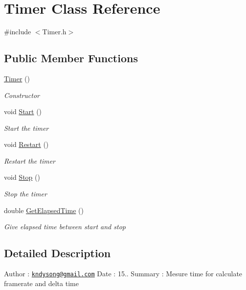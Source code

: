 \hypertarget{class_timer}{}\section{Timer Class Reference}
\label{class_timer}


{\ttfamily \#include $<$Timer.\+h$>$}

\subsection*{Public Member Functions}
\begin{DoxyCompactItemize}
\item 
\mbox{\hyperlink{class_timer_a5f16e8da27d2a5a5242dead46de05d97}{Timer}} ()
\begin{DoxyCompactList}\small\item\em Constructor \end{DoxyCompactList}\item 
void \mbox{\hyperlink{class_timer_a4e607b129b392c11adddd9641a320436}{Start}} ()
\begin{DoxyCompactList}\small\item\em Start the timer \end{DoxyCompactList}\item 
void \mbox{\hyperlink{class_timer_a44a5a286f0086968f0b079c089befbd2}{Restart}} ()
\begin{DoxyCompactList}\small\item\em Restart the timer \end{DoxyCompactList}\item 
void \mbox{\hyperlink{class_timer_a6379e797f968aaee6ac3bb12dc6b81c5}{Stop}} ()
\begin{DoxyCompactList}\small\item\em Stop the timer \end{DoxyCompactList}\item 
double \mbox{\hyperlink{class_timer_abee36a752625ebb88c77e41979e8b3d6}{Get\+Elapsed\+Time}} ()
\begin{DoxyCompactList}\small\item\em Give elapsed time between start and stop \end{DoxyCompactList}\end{DoxyCompactItemize}


\subsection{Detailed Description}
Author \+: \href{mailto:kndysong@gmail.com}{\tt kndysong@gmail.\+com} Date \+: 15.. Summary \+: Mesure time for calculate framerate and delta time 

